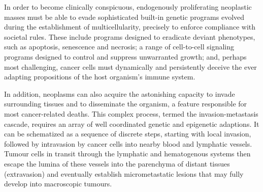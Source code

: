 In order to become clinically conspicuous, endogenously proliferating neoplastic
masses must be able to evade sophisticated \mbox{built-in} genetic programs
evolved during the establishment of multicellularity, precisely to enforce
compliance with societal rules.  These include programs designed to eradicate
deviant phenotypes, such as apoptosis, senescence and necrosis; a range of
\mbox{cell-to-cell} signaling programs designed to control and suppress
unwarranted growth; and, perhaps most challenging, cancer cells must dynamically
and persistently deceive the ever adapting propositions of the host organism's
immune system.


In addition, neoplasms can also acquire the astonishing capacity to invade
surrounding tissues and to disseminate the organism, a feature responsible for
most cancer-related deaths.  This complex process, termed the
\mbox{invasion-metastasis} cascade,\cite{valastyan_tumor_2011} requires an array
of well coordinated genetic and epigenetic adaptions.  It can be schematized as
a sequence of discrete steps, starting with local invasion, followed by
intravasion by cancer cells into nearby blood and lymphatic vessels.  Tumour
cells in transit through the lymphatic and hematogenous systems then escape
the lumina of these vessels into the parenchyma of distant tissues (extravasion)
and eventually establish micrometastatic lesions that may fully develop into
macroscopic tumours.

